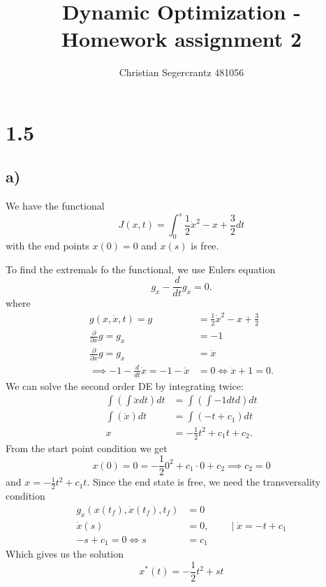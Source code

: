 \documentclass{article}
\title{Dynamic Optimization - Homework assignment 2}
\author{Christian Segercrantz 481056}
\begin{document}
	\maketitle
	\pagebreak

\section*{1.5}
\subsection*{a)}

We have the functional
\begin{equation}
	J(x,t) = \int_{0}^{s} \frac{1}{2}\dot{x}^2-x+\frac{3}{2} dt
\end{equation}
with the end points $x(0) = 0$ and $x(s)$ is free.

To find the extremals fo the functional, we use Eulers equation
\begin{equation}
	g_x-\frac{d}{dt}g_{\dot{x}} = 0.
\end{equation}
where
\begin{align}
	g(x,\dot{x},t) = g &= \frac{1}{2}\dot{x}^2-x+\frac{3}{2}\\
	\frac{\partial}{\partial x} g= g_x &= -1  \\
	\frac{\partial}{\partial \dot{x}} g= g_{\dot{x}} &= \dot{x} \\
	\implies -1- \frac{d}{dt} \dot{x} = -1 - \ddot{x} &= 0 \iff \ddot{x} +1 = 0.
\end{align}
We can solve the second order DE by integrating twice:
\begin{align}
	\int\left(\int \ddot{x} dt\right)dt &= \int\left(\int -1 dtd \right)dt \\
	\int\left(\dot{x}\right)dt &=\int\left(-t+c_1\right)dt \\
	x &= -\frac{1}{2}t^2+c_1t + c_2.
\end{align}
From the start point condition we get
\begin{equation}
	x(0) = 0 = -\frac{1}{2}0^2+c_1\cdot 0 + c_2 \implies c_2=0
\end{equation}
and $x = -\frac{1}{2}t^2+c_1t$. Since the end state is free, we need the transversality condition 
\begin{align}
	g_{\dot{x}}(x(t_f),\dot{x}(t_f), t_f) &= 0\\
	\dot{x}(s) &= 0, \qquad \mid \dot{x} = -t + c_1 \\
	-s+c_1 = 0 \iff s&=c_1
\end{align}
Which gives us the solution
\begin{equation}
	x^*(t) = -\frac{1}{2}t^2+st
\end{equation}
\end{document}
